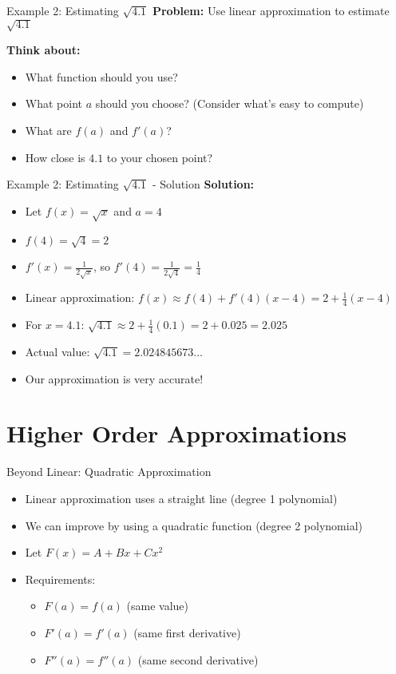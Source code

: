 \documentclass[aspectratio=169]{beamer}
\begin{document}
\begin{frame}{Example 2: Estimating $\sqrt{4.1}$}
\textbf{Problem:} Use linear approximation to estimate $\sqrt{4.1}$

\textbf{Think about:}
\begin{itemize}
    \item What function should you use?
    \item What point $a$ should you choose? (Consider what's easy to compute)
    \item What are $f(a)$ and $f'(a)$?
    \item How close is $4.1$ to your chosen point?
\end{itemize}
\end{frame}

\begin{frame}{Example 2: Estimating $\sqrt{4.1}$ - Solution}
\textbf{Solution:}
\begin{itemize}
    \item Let $f(x) = \sqrt{x}$ and $a = 4$
    \item $f(4) = \sqrt{4} = 2$
    \item $f'(x) = \frac{1}{2\sqrt{x}}$, so $f'(4) = \frac{1}{2\sqrt{4}} = \frac{1}{4}$
    \item Linear approximation: $f(x) \approx f(4) + f'(4)(x-4) = 2 + \frac{1}{4}(x-4)$
    \item For $x = 4.1$: $\sqrt{4.1} \approx 2 + \frac{1}{4}(0.1) = 2 + 0.025 = 2.025$
    \item Actual value: $\sqrt{4.1} = 2.024845673...$
    \item Our approximation is very accurate!
\end{itemize}
\end{frame}

\section{Higher Order Approximations}

\begin{frame}{Beyond Linear: Quadratic Approximation}
\begin{itemize}
    \item Linear approximation uses a straight line (degree 1 polynomial)
    \item We can improve by using a quadratic function (degree 2 polynomial)
    \item Let $F(x) = A + Bx + Cx^2$
    \item Requirements:
    \begin{itemize}
        \item $F(a) = f(a)$ (same value)
        \item $F'(a) = f'(a)$ (same first derivative)
        \item $F''(a) = f''(a)$ (same second derivative)
    \end{itemize}
\end{itemize}
\end{frame}
\end{document}
